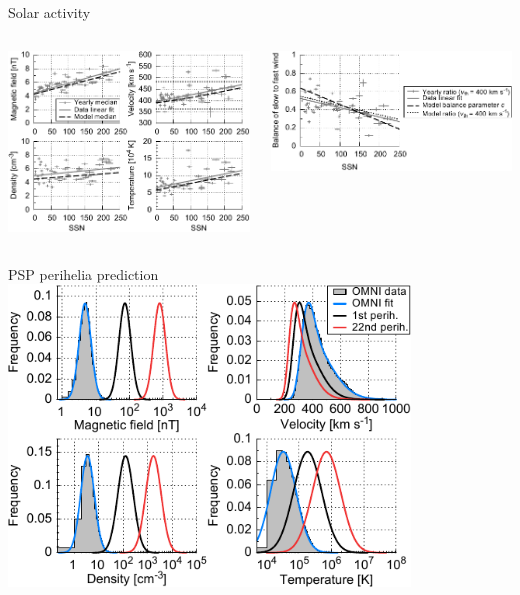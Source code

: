 \begin{frame}[plain,c]{Solar activity}{}
	\begin{columns}[c]
		
		\includegraphics[width=\textwidth]{../figures_paper/OMNI_yearly_BVNTvsSSN_a.pdf}


		\includegraphics[width=\textwidth]{../figures_paper/Vdbl_SSN_ratio_f_plot.pdf}

	\end{columns}
\end{frame}
\begin{frame}[plain,c]{PSP perihelia prediction}{}
	\centering
	\includegraphics[width=0.8\textwidth]{../figures_paper/SPP_sw_distributions_b.pdf}
\end{frame}
